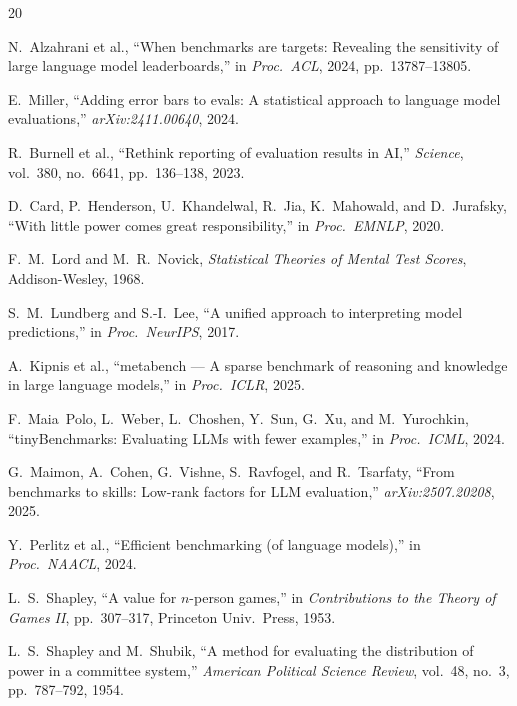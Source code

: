 \documentclass[conference]{IEEEtran}
\begin{document}
\begin{thebibliography}{20}

N.~Alzahrani et al.,
``When benchmarks are targets: Revealing the sensitivity of large language model leaderboards,''
in \emph{Proc.\ ACL}, 2024, pp.~13787--13805.

E.~Miller,
``Adding error bars to evals: A statistical approach to language model evaluations,''
\emph{arXiv:2411.00640}, 2024.

R.~Burnell et al.,
``Rethink reporting of evaluation results in AI,''
\emph{Science}, vol.~380, no.~6641, pp.~136--138, 2023.

D.~Card, P.~Henderson, U.~Khandelwal, R.~Jia, K.~Mahowald, and D.~Jurafsky,
``With little power comes great responsibility,''
in \emph{Proc.\ EMNLP}, 2020.

F.~M.~Lord and M.~R.~Novick,
\emph{Statistical Theories of Mental Test Scores},
Addison-Wesley, 1968.

S.~M.~Lundberg and S.-I.~Lee,
``A unified approach to interpreting model predictions,''
in \emph{Proc.\ NeurIPS}, 2017.

A.~Kipnis et al.,
``metabench --- A sparse benchmark of reasoning and knowledge in large language models,''
in \emph{Proc.\ ICLR}, 2025.

F.~Maia~Polo, L.~Weber, L.~Choshen, Y.~Sun, G.~Xu, and M.~Yurochkin,
``tinyBenchmarks: Evaluating LLMs with fewer examples,''
in \emph{Proc.\ ICML}, 2024.

G.~Maimon, A.~Cohen, G.~Vishne, S.~Ravfogel, and R.~Tsarfaty,
``From benchmarks to skills: Low-rank factors for LLM evaluation,''
\emph{arXiv:2507.20208}, 2025.

Y.~Perlitz et al.,
``Efficient benchmarking (of language models),''
in \emph{Proc.\ NAACL}, 2024.

L.~S.~Shapley,
``A value for $n$-person games,''
in \emph{Contributions to the Theory of Games II}, pp.~307--317, Princeton Univ.\ Press, 1953.

L.~S.~Shapley and M.~Shubik,
``A method for evaluating the distribution of power in a committee system,''
\emph{American Political Science Review}, vol.~48, no.~3, pp.~787--792, 1954.


\end{thebibliography}
\end{document}
